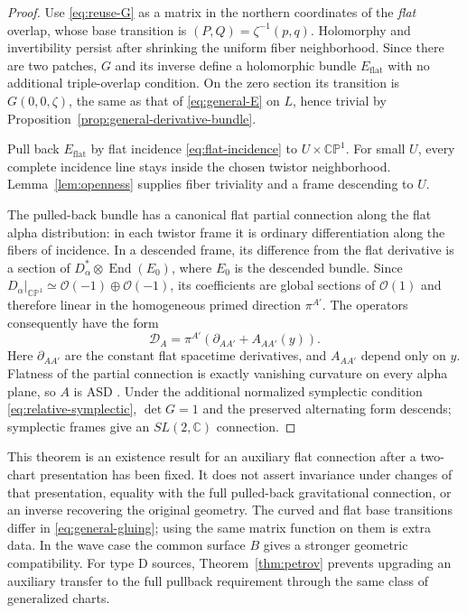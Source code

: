 \documentclass[11pt]{article}
\numberwithin{equation}{section}
\theoremstyle{definition}
\theoremstyle{remark}
\newcommand{\C}{\mathbb C}
\newcommand{\CP}{\mathbb{CP}}
\newcommand{\OO}{\mathcal O}
\newcommand{\End}{\operatorname{End}}
\begin{document}
\begin{proof}
Use \eqref{eq:reuse-G} as a matrix in the northern coordinates of the \emph{flat} overlap, whose base transition is $(P,Q)=\zeta^{-1}(p,q)$. Holomorphy and invertibility persist after shrinking the uniform fiber neighborhood. Since there are two patches, $G$ and its inverse define a holomorphic bundle $E_{\mathrm{flat}}$ with no additional triple-overlap condition. On the zero section its transition is $G(0,0,\zeta)$, the same as that of \eqref{eq:general-E} on $L$, hence trivial by Proposition~\ref{prop:general-derivative-bundle}.

Pull back $E_{\mathrm{flat}}$ by flat incidence \eqref{eq:flat-incidence} to $U\times\CP^1$. For small $U$, every complete incidence line stays inside the chosen twistor neighborhood. Lemma~\ref{lem:openness} supplies fiber triviality and a frame descending to $U$.

The pulled-back bundle has a canonical flat partial connection along the flat alpha distribution: in each twistor frame it is ordinary differentiation along the fibers of incidence. In a descended frame, its difference from the flat derivative is a section of $D_\alpha^*\otimes\End(E_0)$, where $E_0$ is the descended bundle. Since $D_\alpha|_{\CP^1}\simeq\OO(-1)\oplus\OO(-1)$, its coefficients are global sections of $\OO(1)$ and therefore linear in the homogeneous primed direction $\pi^{A'}$. The operators consequently have the form
\begin{equation}\label{eq:Ward-operators}
\mathcal D_A=\pi^{A'}(\partial_{AA'}+A_{AA'}(y)).
\end{equation}
Here $\partial_{AA'}$ are the constant flat spacetime derivatives, and $A_{AA'}$ depend only on $y$. Flatness of the partial connection is exactly vanishing curvature on every alpha plane, so $A$ is ASD \cite{Ward}. Under the additional normalized symplectic condition \eqref{eq:relative-symplectic}, $\det G=1$ and the preserved alternating form descends; symplectic frames give an $SL(2,\C)$ connection.
\end{proof}

This theorem is an existence result for an auxiliary flat connection after a two-chart presentation has been fixed. It does not assert invariance under changes of that presentation, equality with the full pulled-back gravitational connection, or an inverse recovering the original geometry. The curved and flat base transitions differ in \eqref{eq:general-gluing}; using the same matrix function on them is extra data. In the wave case the common surface $B$ gives a stronger geometric compatibility. For type D sources, Theorem~\ref{thm:petrov} prevents upgrading an auxiliary transfer to the full pullback requirement through the same class of generalized charts.
\end{document}

